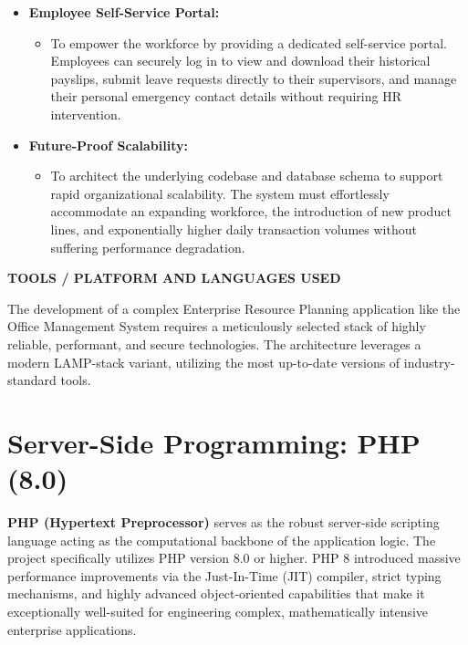 ﻿\documentclass[12pt,a4paper]{report}
\begin{document}
\begin{itemize}
\begin{itemize}
    \end{itemize}
\item \textbf{Employee Self-Service Portal:}
    \begin{itemize}
        \item To empower the workforce by providing a dedicated self-service portal. Employees can securely log in to view and download their historical payslips, submit leave requests directly to their supervisors, and manage their personal emergency contact details without requiring HR intervention.
    \end{itemize}
\item \textbf{Future-Proof Scalability:}
    \begin{itemize}
        \item To architect the underlying codebase and database schema to support rapid organizational scalability. The system must effortlessly accommodate an expanding workforce, the introduction of new product lines, and exponentially higher daily transaction volumes without suffering performance degradation.
    \end{itemize}
\end{itemize}

\newpage
\vspace*{\fill}
\begin{center}
{\LARGE \textbf{TOOLS / PLATFORM AND LANGUAGES USED}}
\end{center}
\vspace*{\fill}

\newpage
The development of a complex Enterprise Resource Planning application like the Office Management System requires a meticulously selected stack of highly reliable, performant, and secure technologies. The architecture leverages a modern LAMP-stack variant, utilizing the most up-to-date versions of industry-standard tools.

\section*{Server-Side Programming: PHP (8.0)}
\textbf{PHP (Hypertext Preprocessor)} serves as the robust server-side scripting language acting as the computational backbone of the application logic. The project specifically utilizes PHP version 8.0 or higher. PHP 8 introduced massive performance improvements via the Just-In-Time (JIT) compiler, strict typing mechanisms, and highly advanced object-oriented capabilities that make it exceptionally well-suited for engineering complex, mathematically intensive enterprise applications. 
\end{document}
